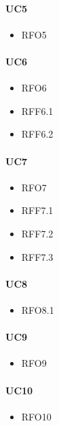 \paragraph{UC5}
\quad
\begin{multicols}{3}
    \begin{itemize}
        \item RFO5
    \end{itemize}
\end{multicols}

\paragraph{UC6}
\quad
\begin{multicols}{3}
    \begin{itemize}
        \item RFO6
        \item RFF6.1
        \item RFF6.2
    \end{itemize}
\end{multicols}

\paragraph{UC7}
\quad
\begin{multicols}{3}
    \begin{itemize}
        \item RFO7
        \item RFF7.1
        \item RFF7.2
        \item RFF7.3
    \end{itemize}
\end{multicols}

\paragraph{UC8}
\quad
\begin{multicols}{3}
    \begin{itemize}
        \item RFO8.1
    \end{itemize}
\end{multicols}

\paragraph{UC9}
\quad
\begin{multicols}{3}
    \begin{itemize}
        \item RFO9
    \end{itemize}
\end{multicols}

\paragraph{UC10}
\quad
\begin{multicols}{3}
    \begin{itemize}
        \item RFO10
    \end{itemize}
\end{multicols}
